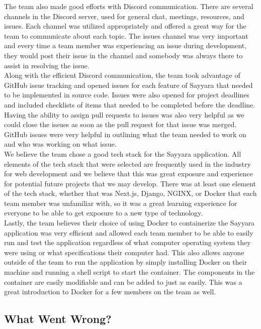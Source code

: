 \documentclass{article}
\begin{document}
\noindent The team also made good efforts with Discord communication. There are several channels in the Discord server, used for general chat, meetings,
resources, and issues. Each channel was utilized appropriately and offered a great way for the team to communicate about each topic. The issues channel was
very important and every time a team member was experiencing an issue during development, they would post their issue in the channel and somebody was always
there to assist in resolving the issue.\\
\noindent Along with the efficient Discord communication, the team took advantage of GitHub issue tracking and opened issues for each feature of Sayyara
that needed to be implemented in source code. Issues were also opened for project deadlines and included checklists of items that needed to be completed
before the deadline. Having the ability to assign pull requests to issues was also very helpful as we could close the issues as soon as the pull request for
that issue was merged. GitHub issues were very helpful in outlining what the team needed to work on and who was working on what issue.\\

\noindent We believe the team chose a good tech stack for the Sayyara application. All elements of the tech stack that were selected are frequently used in
the industry for web development and we believe that this was great exposure and experience for potential future projects that we may develop. There was at
least one element of the tech stack, whether that was Next.js, Django, NGINX, or Docker that each team member was unfamiliar with, so it was a great
learning experience for everyone to be able to get exposure to a new type of technology.\\

\noindent Lastly, the team believes their choice of using Docker to containerize the Sayyara application was very efficient and allowed each team member to
be able to easily run and test the application regardless of what computer operating system they were using or what specifications their computer had. This
also allows anyone outside of the team to run the application by simply installing Docker on their machine and running a shell script to start the
container. The components in the container are easily modifiable and can be added to just as easily. This was a great introduction to Docker for a few
members on the team as well.

\subsection{What Went Wrong?}
\end{document}
